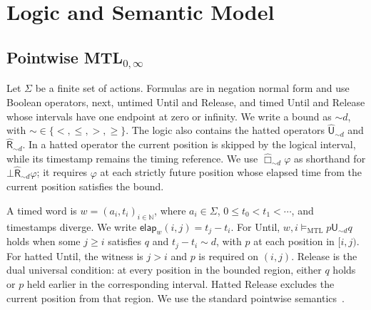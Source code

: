 \documentclass[10pt,journal,compsoc]{IEEEtran}
\newcommand{\Nat}{\mathbb{N}}
\newcommand{\satM}{\models_{\mathrm{MTL}}}
\newcommand{\Until}{\mathbin{\mathsf{U}}}
\newcommand{\hUntil}{\mathbin{\widehat{\mathsf{U}}}}
\newcommand{\hRelease}{\mathbin{\widehat{\mathsf{R}}}}
\newcommand{\elapsed}{\mathsf{elap}}
\begin{document}
\section{Logic and Semantic Model}
\label{sec:logic}
\subsection{Pointwise MTL$_{0,\infty}$}
\label{sec:mtl}
Let $\Sigma$ be a finite set of actions. Formulas are in negation normal
form and use Boolean operators, next, untimed Until and Release, and timed
Until and Release whose intervals have one endpoint at zero or infinity.
We write a bound as $\sim d$, with $\sim\in\{<,\le,>,\ge\}$. The logic also
contains the hatted operators $\hUntil_{\sim d}$ and
$\hRelease_{\sim d}$. In a hatted operator the current position is skipped
by the logical interval, while its timestamp remains the timing reference.
We use $\widehat{\Box}_{\sim d}\varphi$ as shorthand for
$\bot\hRelease_{\sim d}\varphi$; it requires $\varphi$ at each strictly
future position whose elapsed time from the current position satisfies the
bound.

A timed word is $w=(a_i,t_i)_{i\in\Nat}$, where $a_i\in\Sigma$,
$0\le t_0<t_1<\cdots$, and timestamps diverge. We write
$\elapsed_w(i,j)=t_j-t_i$. For Until, $w,i\satM p\Until_{\sim d}q$
holds when some $j\ge i$ satisfies $q$ and $t_j-t_i\sim d$, with $p$ at
each position in $[i,j)$. For hatted Until, the witness is $j>i$ and $p$
is required on $(i,j)$. Release is the dual universal condition: at every
position in the bounded region, either $q$ holds or $p$ held earlier in the
corresponding interval. Hatted Release excludes the current position from
that region. We use the standard pointwise semantics~\cite{MTLsem}.
\end{document}
